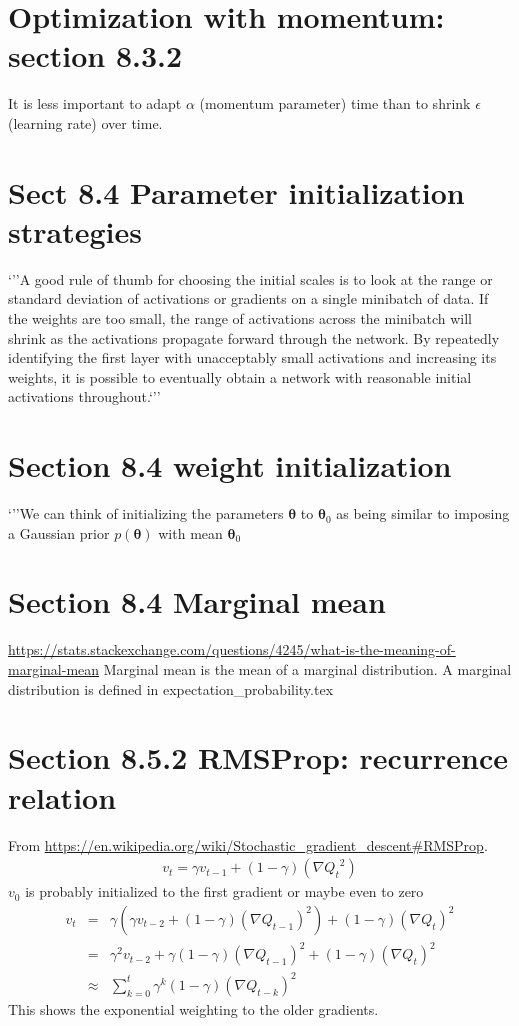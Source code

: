 \documentclass{article}
\newcommand{\ber}{\begin{eqnarray}}
\newcommand{\eer}{\end{eqnarray}}
\begin{document}
\section{Optimization with momentum: section 8.3.2}
It is less important to adapt $\alpha$ (momentum parameter) time than to shrink $\epsilon$ (learning rate)  over time.


%
%
%

\section{Sect 8.4 Parameter initialization strategies}
`''A good rule of thumb for choosing the initial scales is to
look at the range or standard deviation of activations or gradients on a single
minibatch of data. If the weights are too small, the range of activations across the
minibatch will shrink as the activations propagate forward through the network.
By repeatedly identifying the first layer with unacceptably small activations and
increasing its weights, it is possible to eventually obtain a network with reasonable
initial activations throughout.`''

%
%
%

\section{Section 8.4 weight initialization}
`''We can think of initializing the parameters $\pmb{\theta}$ to $\pmb{\theta}_0$ as being similar to imposing a Gaussian prior $p(\pmb{\theta})$ with mean $\pmb{\theta}_0$
%
%
%
\section{Section 8.4 Marginal mean}
\url{https://stats.stackexchange.com/questions/4245/what-is-the-meaning-of-marginal-mean} Marginal mean is the mean of a marginal distribution. A marginal distribution is defined in expectation\_probability.tex
%
%
%
\section{Section 8.5.2 RMSProp: recurrence relation}
From \url{https://en.wikipedia.org/wiki/Stochastic_gradient_descent#RMSProp}.\\
\ber
v_{t} = \gamma{}v_{t-1} + (1-\gamma)(\nabla{Q_t}^2)
\eer
$v_{0}$ is probably initialized to the first gradient or maybe even to zero
\ber
v_{t} &=& \gamma{}(\gamma{}v_{t-2}+(1-\gamma)(\nabla{Q_{t-1}})^2) + (1-\gamma)(\nabla{Q_t})^2\\
&=& \gamma^2v_{t-2} + \gamma(1-\gamma)(\nabla{Q_{t-1}})^2 + (1-\gamma)(\nabla{Q_t})^2\\
&\approx& \sum_{k=0}^{t}\gamma^{k}(1-\gamma)(\nabla{Q_{t-k}})^2
\eer
This shows the exponential weighting to the older gradients.
\end{document}
